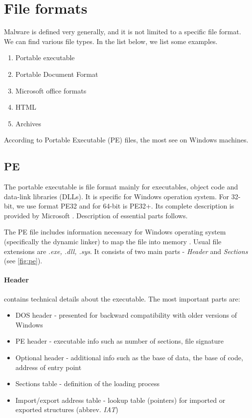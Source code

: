 \section{File formats}
Malware is defined very generally, and it is not limited to a specific file format. We can find various file types. In the list below, we list some examples.
\begin{enumerate}
  \item Portable executable
  \item Portable Document Format
  \item Microsoft office formats
  \item HTML
  \item Archives
\end{enumerate}

According to \cite{AVATLASM39:online} Portable Executable (PE) files, the most see on Windows machines.

\subsection{PE}
The portable executable is file format mainly for executables, object code and data-link libraries (DLLs). It is specific for Windows operation system. For 32-bit, we use format PE32 and for 64-bit is PE32+. Its complete description is provided by Microsoft \cite{PEFormat89:online}. Description of essential parts follows.

The PE file includes information necessary for Windows operating system (specifically the dynamic linker) to map the file into memory \cite{Gibert2020}. Usual file extensions are \emph{.exe, .dll, .sys}. It consists of two main parts - \emph{Header} and \emph{Sections} (see \ref{fig:pe}). 

\paragraph{Header} contains technical details about the executable. The most important parts are:
\begin{itemize}
  \item DOS header - presented for backward compatibility with older versions of Windows
  \item PE header - executable info such as number of sections, file signature
  \item Optional header - additional info such as the base of data, the base of code, address of entry point
  \item Sections table - definition of the loading process
  \item Import/export address table - lookup table (pointers) for imported or exported structures (abbrev. \emph{IAT})
\end{itemize}

